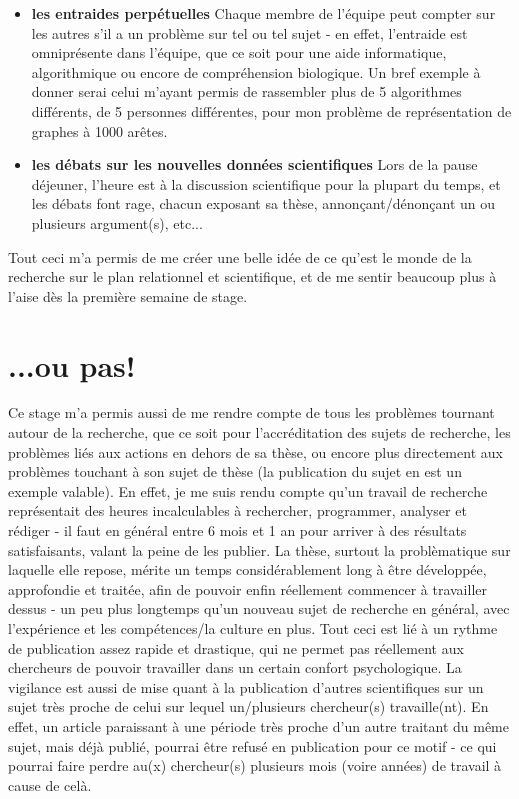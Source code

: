 \documentclass[12pt]{report}
\begin{document}
\begin{spacing}{1.2}
\begin{itemize}
\item \textbf{les entraides perpétuelles}
	\newline
	Chaque membre de l'équipe peut compter sur les autres s'il a un problème sur tel ou tel sujet - en effet, l'entraide est omniprésente dans l'équipe, que ce soit pour une aide informatique, algorithmique ou encore de compréhension biologique. Un bref exemple à donner serai celui m'ayant permis de rassembler plus de 5 algorithmes différents, de 5 personnes différentes, pour mon problème de représentation de graphes à 1000 arêtes.
\item \textbf{les débats sur les nouvelles données scientifiques}
	\newline
	Lors de la pause déjeuner, l'heure est à la discussion scientifique pour la plupart du temps, et les débats font rage, chacun exposant sa thèse, annonçant/dénonçant un ou plusieurs argument(s), etc...
\end{itemize}
Tout ceci m'a permis de me créer une belle idée de ce qu'est le monde de la recherche sur le plan relationnel et scientifique, et de me sentir beaucoup plus à l'aise dès la première semaine de stage.

\section{...ou pas!}

Ce stage m'a permis aussi de me rendre compte de tous les problèmes tournant autour de la recherche, que ce soit pour l'accréditation des sujets de recherche, les problèmes liés aux actions en dehors de sa thèse, ou encore plus directement aux problèmes touchant à son sujet de thèse (la publication du sujet en est un exemple valable).
\newline
En effet, je me suis rendu compte qu'un travail de recherche représentait des heures incalculables à rechercher, programmer, analyser et rédiger - il faut en général entre 6 mois et 1 an pour arriver à des résultats satisfaisants, valant la peine de les publier.
\newline
La thèse, surtout la problèmatique sur laquelle elle repose, mérite un temps considérablement long à être développée, approfondie et traitée, afin de pouvoir enfin réellement commencer à travailler dessus - un peu plus longtemps qu'un nouveau sujet de recherche en général, avec l'expérience et les compétences/la culture en plus.
\newline
Tout ceci est lié à un rythme de publication assez rapide et drastique, qui ne permet pas réellement aux chercheurs de pouvoir travailler dans un certain confort psychologique.
\newline
La vigilance est aussi de mise quant à la publication d'autres scientifiques sur un sujet très proche de celui sur lequel un/plusieurs chercheur(s) travaille(nt). En effet, un article paraissant à une période très proche d'un autre traitant du même sujet, mais déjà publié, pourrai être refusé en publication pour ce motif - ce qui pourrai faire perdre au(x) chercheur(s) plusieurs mois (voire années) de travail à cause de celà.


\end{spacing}
\end{document}

